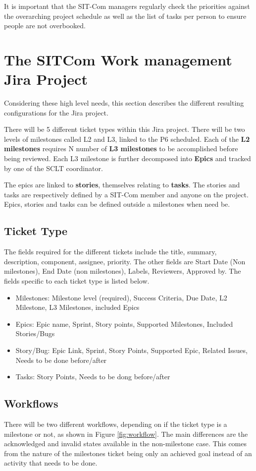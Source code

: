 \documentclass[SE,authoryear,toc]{lsstdoc}
\begin{document}
It is important that the SIT-Com managers regularly check the priorities against the overarching project schedule as well as the list of tasks per person to ensure people are not overbooked. 




\section{The SITCom Work management Jira Project }
Considering these high level needs, this section describes the different resulting configurations for the Jira project. 

There will be 5 different ticket types within this Jira project.
There will be two levels of milestones called L2 and L3, linked to the P6 scheduled. 
Each of the {\bf L2 milestones} requires N number of {\bf L3 milestones} to be accomplished before being reviewed. 
Each L3 milestone is further decomposed into {\bf Epics} and tracked by one of the SCLT coordinator. 

The epics are linked to {\bf stories}, themselves relating to {\bf tasks}. 
The stories and tasks are respectively defined by a SIT-Com member and anyone on the project. 
Epics, stories and tasks can be defined outside a milestones when need be.

\subsection{Ticket Type}
The fields required for the different tickets include the title, summary, description, component, assignee, priority. 
The other fields are Start Date (Non milestones), End Date (non milestones), Labels, Reviewers, Approved by.  
The fields specific to each ticket type is listed below.
\begin{itemize}
\item{Milestones}: Milestone level (required), Success Criteria, Due Date, L2 Milestone, L3 Milestones, included Epics
\item{Epics}: Epic name, Sprint, Story points, Supported Milestones, Included Stories/Bugs
\item{Story/Bug}: Epic Link, Sprint, Story Points, Supported Epic, Related Issues, Needs to be done before/after
\item{Tasks}: Story Points, Needs to be dong before/after
\end{itemize}

\subsection{Workflows}
There will be two different workflows, depending on if the ticket type is a milestone or not, as shown in Figure \ref{fig:workflow}. 
The main differences are the acknowledged and invalid states available in the non-milestone case.  
This comes from the nature of the milestones ticket being only an achieved goal instead of an activity that needs to be done. 
\end{document}
